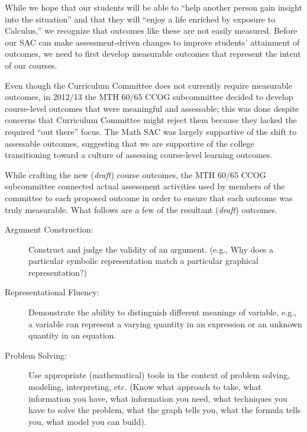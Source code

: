 While we hope that our students will be able to ``help another person gain insight into the situation'' and that they will ``enjoy a life enriched by exposure to Calculus,'' we recognize that outcomes like these are not easily measured. Before our SAC can make assessment-driven changes to improve students' attainment of outcomes, we need to first develop measurable outcomes that represent the intent of our courses.

Even though the Curriculum Committee does not currently require measurable outcomes, in 2012/13 the MTH 60/65 CCOG subcommittee decided to develop course-level outcomes that were meaningful and assessable; this was done despite concerns that Curriculum Committee might reject them because they lacked the required ``out there'' focus.  The Math SAC was largely supportive of the shift to assessable outcomes, suggesting that we are supportive of the college transitioning toward a culture of assessing course-level learning outcomes.  

While crafting the new (\emph{draft}) course outcomes, the MTH 60/65 CCOG subcommittee connected actual assessment activities used by members of the committee to each proposed outcome in order to ensure that each outcome was truly measurable.  What follows are a few of the resultant (\emph{draft}) outcomes.
\begin{description}
\item[Argument Construction:] Construct and judge the validity of an argument. (e.g., Why does a particular symbolic representation match a particular graphical representation?)

\item[Representational Fluency:] Demonstrate the ability to distinguish different meanings of variable, e.g., a variable can represent a varying quantity in an expression or an unknown quantity in an equation.

\item[Problem Solving:] Use appropriate (mathematical) tools in the context of problem solving, modeling, interpreting, etc. (Know what approach to take, what information you have, what information you need, what techniques you have to solve the problem, what the graph tells you, what the formula tells you, what model you can build).
\end{description}

